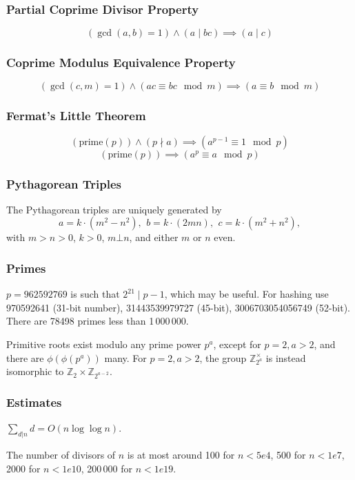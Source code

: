 \documentclass[
	a4paper,
	landscape,
	10pt,
]{article}
\begin{document}
\begin{multicols}{3}
        \subsubsection*{Partial Coprime Divisor Property}
        $$
        (\gcd(a,b)=1) \land (a \mid bc) \implies (a \mid c)
        $$
        \subsubsection*{Coprime Modulus Equivalence Property}
        $$
        (\gcd(c,m)=1) \land (ac \equiv bc \mod m) \implies (a \equiv b \mod m)
        $$
        \subsubsection*{Fermat's Little Theorem}
        $$
        (\text{prime}(p)) \land (p \nmid a) \implies (a^{p-1} \equiv 1 \mod p)
        $$
        $$
        (\text{prime}(p)) \implies (a^p \equiv a \mod p) 
        $$


\subsubsection*{Pythagorean Triples}
 The Pythagorean triples are uniquely generated by
 \[ a=k\cdot (m^{2}-n^{2}),\ \,b=k\cdot (2mn),\ \,c=k\cdot (m^{2}+n^{2}), \]
 with $m > n > 0$, $k > 0$, $m \bot n$, and either $m$ or $n$ even.

\subsubsection*{Primes}
	$p=962592769$ is such that $2^{21} \mid p-1$, which may be useful. For hashing
	use 970592641 (31-bit number), 31443539979727 (45-bit), 3006703054056749
	(52-bit). There are 78498 primes less than 1\,000\,000.

	Primitive roots exist modulo any prime power $p^a$, except for $p = 2, a > 2$, and there are $\phi(\phi(p^a))$ many.
	For $p = 2, a > 2$, the group $\mathbb Z_{2^a}^\times$ is instead isomorphic to $\mathbb Z_2 \times \mathbb Z_{2^{a-2}}$.

\subsubsection*{Estimates}
	$\sum_{d|n} d = O(n \log \log n)$.

	The number of divisors of $n$ is at most around 100 for $n < 5e4$, 500 for $n < 1e7$, 2000 for $n < 1e10$, 200\,000 for $n < 1e19$.


\end{multicols}
\end{document}
